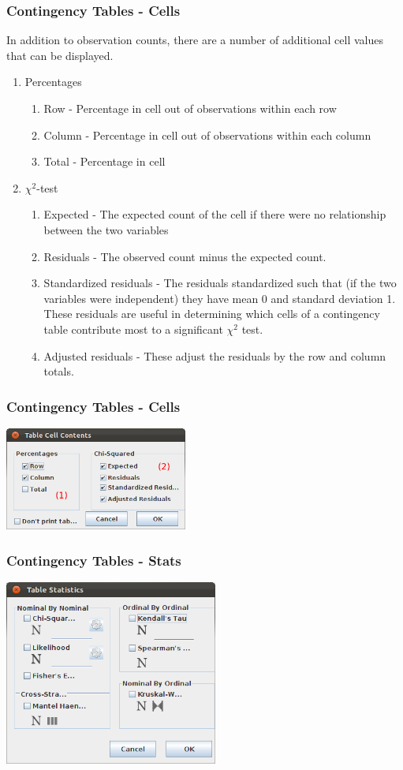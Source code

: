 \documentclass[xcolor={table}]{beamer}
\begin{document}
\begin{frame}[shrink=5]\frametitle{Contingency Tables - Cells}
 In addition to observation counts, there are a number of additional cell values that can be displayed.
\begin{enumerate}
\item Percentages
\begin{enumerate}
  \item Row - Percentage in cell out of observations within each row
  \item Column - Percentage in cell out of observations within each column
  \item Total - Percentage in cell 
\end{enumerate}
\item $\chi^2$-test
\begin{enumerate}
\item Expected - The expected count of the cell if there were no relationship between the two variables
\item Residuals - The observed count minus the expected count.
\item Standardized residuals - The residuals standardized such that (if the two variables were independent) they have mean 0 and standard deviation 1. These residuals are useful in determining which cells of a contingency table contribute most to a significant $\chi^2$ test.
\item Adjusted residuals - These adjust the residuals by the row and column totals. 
\end{enumerate}
\end{enumerate}
\end{frame}

\begin{frame}\frametitle{Contingency Tables - Cells}
\begin{center}
\includegraphics[width=6cm]{conting3.png}
\end{center}
\end{frame}

\begin{frame}\frametitle{Contingency Tables - Stats}
\begin{center}
\includegraphics[width=7cm]{conting4.png}
\end{center}
\end{frame}
\end{document}
